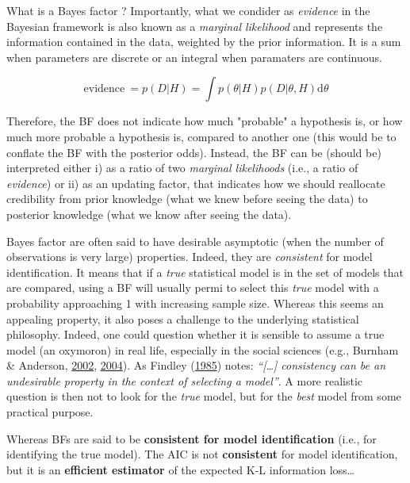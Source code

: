 \documentclass[a4paper,12pt,twoside,openright,oldfontcommands]{memoir}
\begin{document}
\begin{mybox}[label = BF]{What is a Bayes factor ?}
Importantly, what we condider as \textit{evidence} in the Bayesian framework is also known as a \textit{marginal likelihood} and represents the information contained in the data, weighted by the prior information. It is a sum when parameters are discrete or an integral when paramaters are continuous.

$$\text{evidence}\ = p(D|H) = \int p(\theta|H) p(D|\theta,H) \text{d}\theta$$

Therefore, the BF does not indicate how much "probable" a hypothesis is, or how much more probable a hypothesis is, compared to another one (this would be to conflate the BF with the posterior odds). Instead, the BF can be (should be) interpreted either i) as a ratio of two \textit{marginal likelihoods} (i.e., a ratio of \textit{evidence}) or ii) as an updating factor, that indicates how we should reallocate credibility from prior knowledge (what we knew before seeing the data) to posterior knowledge (what we know after seeing the data).

\end{mybox}

Bayes factor are often said to have desirable asymptotic (when the
number of observations is very large) properties. Indeed, they are
\emph{consistent} for model identification. It means that if a
\emph{true} statistical model is in the set of models that are compared,
using a BF will usually permi to select this \emph{true} model with a
probability approaching 1 with increasing sample size. Whereas this
seems an appealing property, it also poses a challenge to the underlying
statistical philosophy. Indeed, one could question whether it is
sensible to assume a true model (an oxymoron) in real life, especially
in the social sciences (e.g., Burnham \& Anderson,
\protect\hyperlink{ref-burnham_model_2002}{2002},
\protect\hyperlink{ref-burnham_multimodel_2004}{2004}). As Findley
(\protect\hyperlink{ref-findley_unbiasedness_1985}{1985}) notes:
\emph{``{[}\ldots{}{]} consistency can be an undesirable property in the
context of selecting a model''}. A more realistic question is then not
to look for the \emph{true} model, but for the \emph{best} model from
some practical purpose.

Whereas BFs are said to be \textbf{consistent for model identification}
(i.e., for identifying the true model). The AIC is not
\textbf{consistent} for model identification, but it is an
\textbf{efficient estimator} of the expected K-L information
loss\ldots{}
\end{document}
